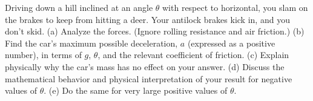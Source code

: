  Driving down a hill inclined at an angle $\theta $ with
respect to horizontal, you slam on the brakes to keep from
hitting a deer. Your antilock brakes kick in, and you don't skid.\hwendpart
 (a) Analyze the forces. (Ignore rolling
resistance and air friction.)\hwendpart
 (b) Find the car's maximum
possible deceleration, $a$ (expressed as a positive number),
in terms of $g$, $\theta$, and the relevant coefficient of
friction.\answercheck\hwendpart
 (c) Explain physically why the car's mass has no
effect on your answer.\hwendpart
 (d) Discuss the mathematical behavior
and physical interpretation of your result for negative
values of $\theta $.\hwendpart
 (e) Do the same for very large positive
values of $\theta $.
